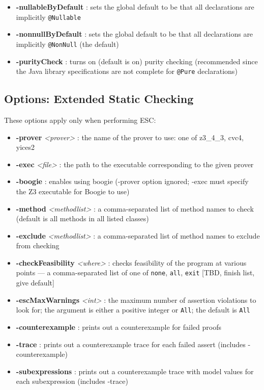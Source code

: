 \begin{itemize}
\item \textbf{-nullableByDefault} : sets the global default to be that all declarations are implicitly \texttt{@Nullable}
\item \textbf{-nonnullByDefault} : sets the global default to be that all 
declarations are implicitly \texttt{@NonNull} (the default)
\item \textbf{-purityCheck} : turns on (default is on) purity checking (recommended since the Java library specifications are not complete for \texttt{@Pure} declarations)
\end{itemize}

\subsection{Options: Extended Static Checking}
\label{OptionsESC}

These options apply only when performing ESC:
\begin{itemize}
\item \textbf{-prover} \textit{<prover>} : the name of the prover to use: one of z3\_4\_3, cvc4, yices2
\item \textbf{-exec} \textit{<file>} : the path to the executable corresponding to the given prover
\item \textbf{-boogie} : enables using boogie (-prover option ignored; -exec must specify the Z3 executable for Boogie to use)
\item \textbf{-method} \textit{<methodlist>} : a comma-separated list of method names to
check (default is all methods in all listed classes)
\item \textbf{-exclude} \textit{<methodlist>} : a comma-separated list of method names to exclude from checking
\item \textbf{-checkFeasibility} \textit{<where>} : checks feasibility of the program at various points --- a comma-separated list of
one of \texttt{none}, \texttt{all}, \texttt{exit} [TBD, finish list,  give default]
\item \textbf{-escMaxWarnings} \textit{<int>} : the maximum number of assertion violations to look for; the argument is either a positive integer or \texttt{All}; the default is \texttt{All}
\item \textbf{-counterexample} : prints out a counterexample for failed proofs
\item \textbf{-trace} : prints out a counterexample trace for each failed assert (includes -counterexample)
\item \textbf{-subexpressions} : prints out a counterexample trace with model values for each subexpression (includes -trace)
\end{itemize}


